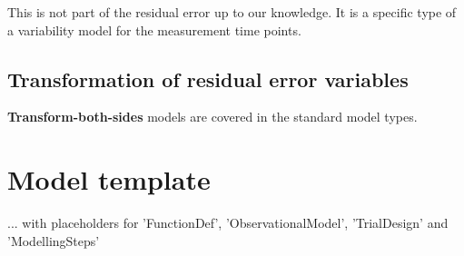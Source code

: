 \documentclass[a4paper,10pt]{article}
\begin{document}
This is not part of the residual error up to our knowledge. It is a specific type of a variability model for the measurement time points.


\subsection{Transformation of residual error variables}
\label{modelKK_RM10}

\textbf{Transform-both-sides} models are covered in the standard model types.




\newpage
\appendix

\section{Model template}
... with placeholders for 'FunctionDef', 'ObservationalModel', 'TrialDesign' and 'ModellingSteps'
\end{document}

